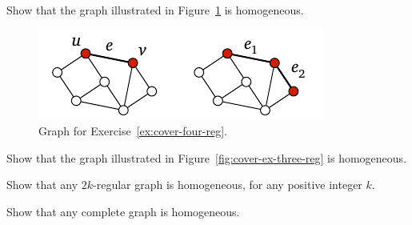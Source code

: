 \begin{ex}\label{ex:cover-four-reg}
    Show that the graph illustrated in Figure~\ref{fig:cover-ex-four-reg} is homogeneous.


    \begin{figure}
        \centering
        \includegraphics[page=\PCoverExFourReg]{figs.pdf}
        \caption{Graph for Exercise~\ref{ex:cover-four-reg}.}\label{fig:cover-ex-four-reg}
    \end{figure}
\end{ex}

\begin{ex}\label{ex:cover-three-reg2}
    Show that the graph illustrated in Figure~\ref{fig:cover-ex-three-reg} is homogeneous.

\end{ex}

\begin{ex}
    Show that any $2k$-regular graph is homogeneous, for any positive integer $k$.
\end{ex}

\begin{ex}\label{ex:cover-complete}
    Show that any complete graph is homogeneous.

\end{ex}

